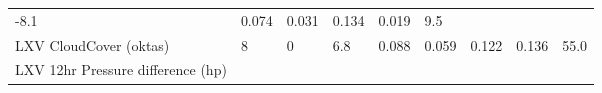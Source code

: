 \documentclass[11pt]{article}
\begin{document}
\begin{longtable}[]{@{}lllllllll@{}}
\begin{minipage}[t]{0.08\columnwidth}
-8.1\strut
\end{minipage} & \begin{minipage}[t]{0.05\columnwidth}\raggedright\strut
0.074\strut
\end{minipage} & \begin{minipage}[t]{0.07\columnwidth}\raggedright\strut
0.031\strut
\end{minipage} & \begin{minipage}[t]{0.06\columnwidth}\raggedright\strut
0.134\strut
\end{minipage} & \begin{minipage}[t]{0.06\columnwidth}\raggedright\strut
0.019\strut
\end{minipage} & \begin{minipage}[t]{0.07\columnwidth}\raggedright\strut
9.5\strut
\end{minipage}\tabularnewline
\begin{minipage}[t]{0.25\columnwidth}\raggedright\strut
LXV CloudCover (oktas)\strut
\end{minipage} & \begin{minipage}[t]{0.06\columnwidth}\raggedright\strut
8\strut
\end{minipage} & \begin{minipage}[t]{0.06\columnwidth}\raggedright\strut
0\strut
\end{minipage} & \begin{minipage}[t]{0.08\columnwidth}\raggedright\strut
6.8\strut
\end{minipage} & \begin{minipage}[t]{0.05\columnwidth}\raggedright\strut
0.088\strut
\end{minipage} & \begin{minipage}[t]{0.07\columnwidth}\raggedright\strut
0.059\strut
\end{minipage} & \begin{minipage}[t]{0.06\columnwidth}\raggedright\strut
0.122\strut
\end{minipage} & \begin{minipage}[t]{0.06\columnwidth}\raggedright\strut
0.136\strut
\end{minipage} & \begin{minipage}[t]{0.07\columnwidth}\raggedright\strut
55.0\strut
\end{minipage}\tabularnewline
\begin{minipage}[t]{0.25\columnwidth}\raggedright\strut
LXV 12hr Pressure difference (hp)\strut
\end{minipage} & \begin{minipage}[t]{0.06\columnwidth}\raggedright\strut

\end{minipage}
\end{longtable}
\end{document}

